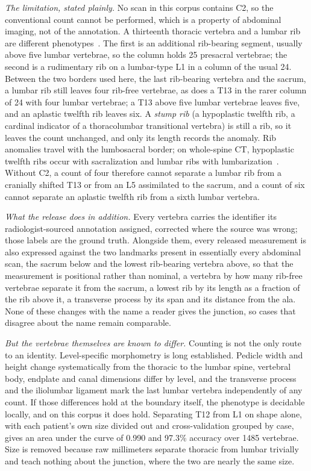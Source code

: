 \documentclass[aapm,mph,amsmath,amssymb,reprint]{revtex4-2}
\begin{document}
\emph{The limitation, stated plainly.} No scan in this corpus contains C2, so the
conventional count cannot be performed, which is a property of abdominal imaging, not of the annotation. A thirteenth thoracic vertebra and a lumbar rib are different
phenotypes~\cite{duplessis2018,poolman2023}. The first is an additional rib-bearing segment,
usually above five lumbar vertebrae, so the column holds 25 presacral vertebrae; the second
is a rudimentary rib on a lumbar-type L1 in a column of the usual 24. Between the two borders
used here, the last rib-bearing vertebra and the sacrum, a lumbar rib still leaves four
rib-free vertebrae, as does a T13 in the rarer column of 24 with four lumbar vertebrae; a T13
above five lumbar vertebrae leaves five, and an aplastic twelfth rib leaves six. A \emph{stump
rib} (a hypoplastic twelfth rib, a cardinal indicator of a thoracolumbar transitional
vertebra) is still a rib, so it leaves the count unchanged, and only its length records the
anomaly. Rib anomalies travel with the lumbosacral border; on whole-spine CT, hypoplastic
twelfth ribs occur with sacralization and lumbar ribs with lumbarization~\cite{nagata2025}.
Without C2, a count of four therefore cannot separate a lumbar rib from a cranially shifted
T13 or from an L5 assimilated to the sacrum, and a count of six cannot separate an aplastic
twelfth rib from a sixth lumbar vertebra.

\emph{What the release does in addition.} Every vertebra carries the identifier its
radiologist-sourced annotation assigned, corrected where the source was wrong; those labels
are the ground truth. Alongside them, every released measurement is also expressed against
the two landmarks present in essentially every abdominal scan, the sacrum below and the
lowest rib-bearing vertebra above, so that the measurement is positional rather than nominal, a vertebra by how many rib-free vertebrae
separate it from the sacrum, a lowest rib by its length as a fraction of the rib above it, a
transverse process by its span and its distance from the ala. None of these changes with the name a reader gives the junction, so cases that disagree about the name remain comparable.

\emph{But the vertebrae themselves are known to differ.} Counting is not the only route to
an identity. Level-specific morphometry is long established. Pedicle width and height change
systematically from the thoracic to the lumbar spine,\cite{zindrick1987} vertebral body,
endplate and canal dimensions differ by level,\cite{panjabi1991,panjabi1992,benzel2015} and
the transverse process and the iliolumbar ligament mark the last lumbar vertebra
independently of any count.\cite{hughes2006,koninwalz2010} If those differences hold at the boundary itself, the phenotype is decidable locally, and on this corpus it does hold. Separating T12 from L1 on shape alone, with each patient's own size divided out and
cross-validation grouped by case, gives an area under the curve of 0.990 and 97.3\%
accuracy over 1485 vertebrae. Size is removed because raw millimeters separate thoracic
from lumbar trivially and teach nothing about the junction, where the two are nearly the
same size.
\end{document}
